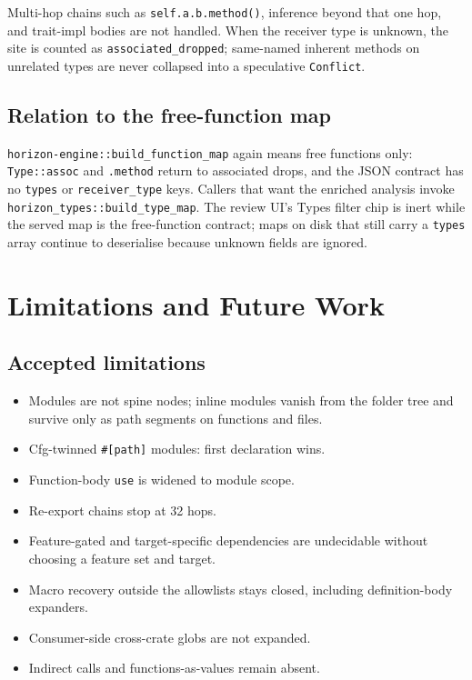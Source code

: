 \documentclass[11pt,a4paper,oneside]{report}
\begin{document}
Multi-hop chains such as \texttt{self.a.b.method()}, inference beyond that
one hop, and trait-impl bodies are not handled. When the receiver type is
unknown, the site is counted as \texttt{associated\_dropped}; same-named
inherent methods on unrelated types are never collapsed into a speculative
\texttt{Conflict}.

\section{Relation to the free-function map}

\texttt{horizon-engine::build\_function\_map} again means free functions only:
\texttt{Type::assoc} and \texttt{.method} return to associated drops, and the
JSON contract has no \texttt{types} or \texttt{receiver\_type} keys. Callers
that want the enriched analysis invoke
\texttt{horizon\_types::build\_type\_map}. The review UI's Types filter chip is
inert while the served map is the free-function contract; maps on disk that
still carry a \texttt{types} array continue to deserialise because unknown
fields are ignored.

\chapter{Limitations and Future Work}
\label{ch:limits}

\section{Accepted limitations}

\begin{itemize}[nosep]
  \item Modules are not spine nodes; inline modules vanish from the folder
    tree and survive only as path segments on functions and files.
  \item Cfg-twinned \texttt{\#[path]} modules: first declaration wins.
  \item Function-body \texttt{use} is widened to module scope.
  \item Re-export chains stop at 32 hops.
  \item Feature-gated and target-specific dependencies are undecidable
    without choosing a feature set and target.
  \item Macro recovery outside the allowlists stays closed, including
    definition-body expanders.
  \item Consumer-side cross-crate globs are not expanded.
  \item Indirect calls and functions-as-values remain absent.
\end{itemize}
\end{document}
